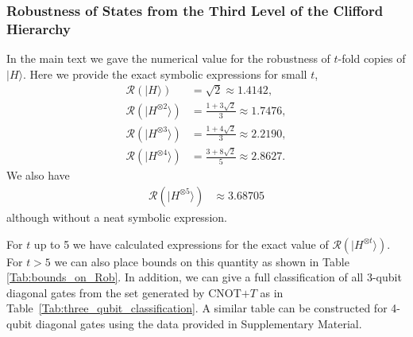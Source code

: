 \documentclass[aps,prl,twocolumn,showpacs,superscriptaddress,groupedaddress,amsmath,amssymb]{revtex4-1}  %
\def\ket #1{\vert #1\rangle}
\begin{document}
\subsubsection{Robustness of States from the Third Level of the Clifford Hierarchy}
In the main text we gave the numerical value for the robustness of $t$-fold copies of $\ket{H}$. Here we provide the exact symbolic expressions for small $t$,
\begin{align}
\mathcal{R}(\ket{H^{}})&=\sqrt{2}\approx 1.4142, \\
\mathcal{R}(\ket{H^{\otimes 2}})&=\frac{1+3\sqrt{2}}{3}\approx 1.7476, \\
\mathcal{R}(\ket{H^{\otimes 3}})&=\frac{1+4\sqrt{2}}{3}\approx 2.2190, \\
\mathcal{R}(\ket{H^{\otimes 4}})&=\frac{3+8\sqrt{2}}{5}\approx 2.8627. 
\end{align}
We also have
\begin{align}
\mathcal{R}(\ket{H^{\otimes 5}})&\approx 3.68705 
\end{align}
although without a neat symbolic expression.


For $t$ up to 5 we have calculated expressions for the exact value of $\mathcal{R}(\ket{H^{\otimes t}})$. For $t>5$ we can also place bounds on this quantity as shown in Table \ref{Tab:bounds_on_Rob}. In addition, we can give a full classification of all 3-qubit diagonal gates from the set generated by CNOT$+T$ as in Table~\ref{Tab:three_qubit_classification}. A similar table can be constructed for 4-qubit diagonal gates using the data provided in Supplementary Material.
\end{document}
